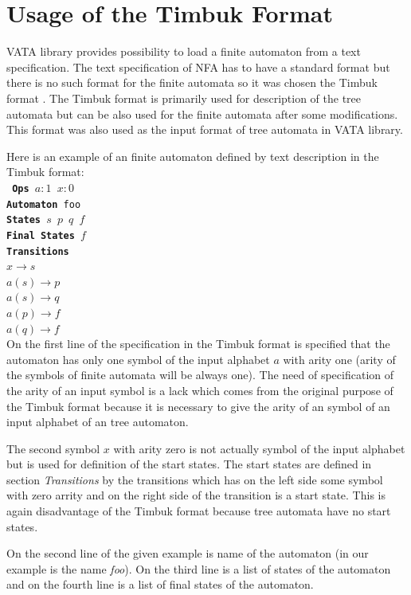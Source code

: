 \section{Usage of the Timbuk Format}
\label{usageTimbuk}
VATA library provides possibility to load a finite automaton from a text specification. 
The text specification of NFA has to have a standard format but there is no such format for the finite automata so it was chosen
the Timbuk format \cite{timbuk}. The Timbuk format is primarily used for description of the tree automata but can be also used for the finite automata
after some modifications. This format was also used as the input format of tree automata in VATA library.

Here is an example of an finite automaton defined by text description in the Timbuk format:\\
\texttt {
  \textbf{Ops} $a:1$ $x:0$\\
  \textbf{Automaton} foo\\
  \textbf{States} $s$ $p$ $q$ $f$\\
  \textbf{Final States} $f$\\
  \textbf{Transitions}\\
  \indent $x \rightarrow s$\\
  \indent $a(s) \rightarrow p$\\
  \indent $a(s) \rightarrow q$\\
  \indent $a(p) \rightarrow f$\\
  \indent $a(q) \rightarrow f$\\
}
On the first line of the specification in the Timbuk format
is specified that the automaton has only one symbol of the input alphabet $a$ with arity one (arity of the symbols of finite automata will
be always one). 
The need of specification of the arity of an input symbol is a lack which comes from the original purpose of the Timbuk format because it is necessary 
to give the arity of an symbol of an input alphabet of an tree automaton.

The second symbol $x$ with arity zero is not actually symbol of the input alphabet but is used for definition of the start states. The
start states are defined in section \emph{Transitions} by the transitions which has on the left side some symbol with zero arrity and on the
right side of the transition is a start state. This is again disadvantage
of the Timbuk format because tree automata have no start states.

On the second line of the given example is name of the automaton (in our example is the name \emph{foo}). 
On the third line is a list of states of the automaton and on the fourth line is a list of final states of the automaton.

